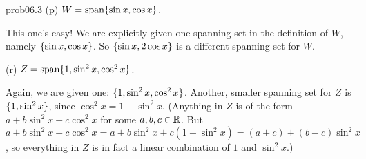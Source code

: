 \begin{sol}{prob06.3}
(p) $W= \textrm{span}\{\sin x, \cos x\}$.

\soln This one's easy! We are explicitly given one spanning set in the definition of $W$, namely $\{\sin x, \cos x \}$. So  $\{\sin x, 2\cos x \}$ is a different spanning set for $W$.   \medskip

(r)  $ Z=\textrm{span}\{1, \sin^2 x, \cos^2 x\}$.   

\soln   Again, we are given one: $\{1, \sin^2 x, \cos^2 x \}$. Another, smaller spanning set for $Z$ is $\{1, \sin^2 x \}$, since $\cos^2 x =1-\sin^2 x$. (Anything in $Z$ is of the form $a+ b\sin^2x + c \cos^2x$ for some $a,b,c \in \mathbb{R}$. But $a+ b\sin^2x + c \cos^2x=  a+ b\sin^2x + c (1-\sin^2 x)= (a+c) + (b-c)\sin^2x$, so everything in $Z$ is in fact a linear combination  of $1$ and $\sin^2x$.)\medskip
%
\end{sol}


